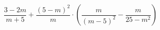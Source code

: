 \begin{ex}[type=expression]
	\begin{condition}
		\(\dfrac{3-2m}{m+5}+\dfrac{(5-m)^2}{m}\cdot\left( \dfrac{m}{(m-5)^2}-\dfrac{m}{25-m^2} \right)\)
	\end{condition}
\end{ex}